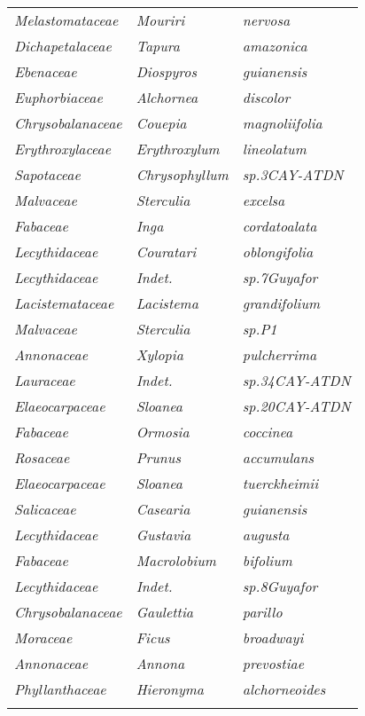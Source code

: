 \documentclass[fleqn,10pt]{ArtEcoFoG} %
\renewenvironment{table}{\begin{table*}}{\end{table*}\ignorespacesafterend}
\begin{document}
\begin{table}
\begin{tabular}[t]{lll}
\em{Melastomataceae} & \em{Mouriri} & \em{nervosa}\\
\em{Dichapetalaceae} & \em{Tapura} & \em{amazonica}\\
\addlinespace
\em{Ebenaceae} & \em{Diospyros} & \em{guianensis}\\
\em{Euphorbiaceae} & \em{Alchornea} & \em{discolor}\\
\em{Chrysobalanaceae} & \em{Couepia} & \em{magnoliifolia}\\
\em{Erythroxylaceae} & \em{Erythroxylum} & \em{lineolatum}\\
\em{Sapotaceae} & \em{Chrysophyllum} & \em{sp.3CAY-ATDN}\\
\addlinespace
\em{Malvaceae} & \em{Sterculia} & \em{excelsa}\\
\em{Fabaceae} & \em{Inga} & \em{cordatoalata}\\
\em{Lecythidaceae} & \em{Couratari} & \em{oblongifolia}\\
\em{Lecythidaceae} & \em{Indet.} & \em{sp.7Guyafor}\\
\em{Lacistemataceae} & \em{Lacistema} & \em{grandifolium}\\
\addlinespace
\em{Malvaceae} & \em{Sterculia} & \em{sp.P1}\\
\em{Annonaceae} & \em{Xylopia} & \em{pulcherrima}\\
\em{Lauraceae} & \em{Indet.} & \em{sp.34CAY-ATDN}\\
\em{Elaeocarpaceae} & \em{Sloanea} & \em{sp.20CAY-ATDN}\\
\em{Fabaceae} & \em{Ormosia} & \em{coccinea}\\
\addlinespace
\em{Rosaceae} & \em{Prunus} & \em{accumulans}\\
\em{Elaeocarpaceae} & \em{Sloanea} & \em{tuerckheimii}\\
\em{Salicaceae} & \em{Casearia} & \em{guianensis}\\
\em{Lecythidaceae} & \em{Gustavia} & \em{augusta}\\
\em{Fabaceae} & \em{Macrolobium} & \em{bifolium}\\
\addlinespace
\em{Lecythidaceae} & \em{Indet.} & \em{sp.8Guyafor}\\
\em{Chrysobalanaceae} & \em{Gaulettia} & \em{parillo}\\
\em{Moraceae} & \em{Ficus} & \em{broadwayi}\\
\em{Annonaceae} & \em{Annona} & \em{prevostiae}\\
\em{Phyllanthaceae} & \em{Hieronyma} & \em{alchorneoides}\\
\addlinespace

\end{tabular}
\end{table}
\end{document}
